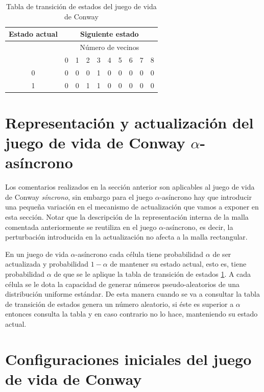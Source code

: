 \documentclass[../proyecto.tex]{memoir}
\begin{document}
\begin{table}[]
\centering
\begin{tabular}{|l|c|c|c|c|c|c|c|c|c|}
\hline
Estado actual           & \multicolumn{9}{c|}{Siguiente estado}  \\ \hline
\multirow{2}{*}{}       & \multicolumn{9}{c|}{Número de vecinos} \\ \cline{2-10} 
                        & 0   & 1  & 2  & 3  & 4 & 5 & 6 & 7 & 8 \\ \hline
\multicolumn{1}{|c|}{0} & 0   & 0  & 0  & 1  & 0 & 0 & 0 & 0 & 0 \\ \hline
\multicolumn{1}{|c|}{1} & 0   & 0  & 1  & 1  & 0 & 0 & 0 & 0 & 0 \\ \hline
\end{tabular}
\caption{Tabla de transición de estados del juego de vida de Conway}
\label{tab:estados}
\end{table}

\section{Representación y actualización del juego de vida de Conway $\alpha$-asíncrono}

Los comentarios realizados en la sección anterior son aplicables al juego de vida de Conway \textit{síncrono}, sin embargo para el juego $\alpha$-asíncrono hay que introducir una pequeña variación en el mecanismo de actualización que vamos a exponer en esta sección. Notar que la descripción de la representación interna de la malla comentada anteriormente se reutiliza en el juego $\alpha$-asíncrono, es decir, la perturbación introducida en la actualización no afecta a la malla rectangular.

En un juego de vida $\alpha$-asíncrono cada célula tiene probabilidad $\alpha$ de ser actualizada y probabilidad $1-\alpha$ de mantener su estado actual, esto es, tiene probabilidad $\alpha$ de que se le aplique la tabla de transición de estados \ref{tab:estados}. A cada célula se le dota la capacidad de generar números pseudo-aleatorios de una distribución uniforme estándar. De esta manera cuando se va a consultar la tabla de transición de estados genera un número aleatorio, si éste es superior a $\alpha$ entonces consulta la tabla y en caso contrario no lo hace, manteniendo su estado actual.

\section{Configuraciones iniciales del juego de vida de Conway} \label{zoo}
\end{document}
